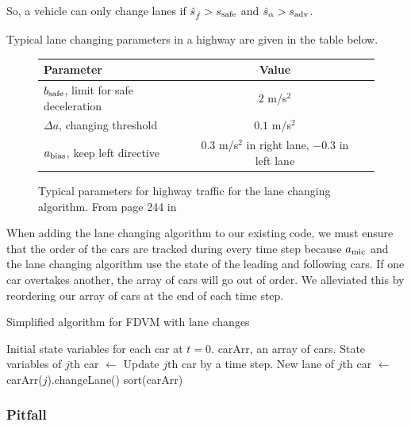 \documentclass[12pt]{article}
\begin{document}
      So, a vehicle can only change lanes if $\hat s_{\hat f} > s_{\rm safe}$ and $\hat s_{\alpha} > s_{\rm adv}$. 

      Typical lane changing parameters in a highway are given in the table below. 
      \begin{figure}[H]
        \begin{center}
          \begin{tabular}{l c c } 
          Parameter & Value \\
          \hline
          $b_{\rm safe}$, limit for safe deceleration & $2$ m/s$^2$ \\
          $\Delta a$, changing threshold & $0.1$ m/s$^2$ \\
          $a_{\rm bias}$, keep left directive & $0.3$ m/s$^2$ in right lane, $-0.3$ in left lane \\

          \end{tabular}
          \end{center}
          \caption{Typical parameters for highway traffic for the lane changing algorithm. From page 244 in \cite{traffic}}
      \end{figure}

      When adding the lane changing algorithm to our existing code, we must ensure that the order of the cars are tracked during every time step because $a_{\rm mic}$ and the lane changing algorithm use the state of the leading and following cars. If one car overtakes another, the array of cars will go out of order. We alleviated this by reordering our array of cars at the end of each time step.  
      \begin{algorithm}
        \caption{Simplified algorithm for FDVM with lane changes}\label{alg:car-following-lane}
        \begin{algorithmic}
        \Require Initial state variables for each car at $t=0$. 
        \Require carArr, an array of cars.
          \State State variables of $j$th car $\gets$ Update $j$th car by a time step.
          \State New lane of $j$th car $\gets$ carArr($j$).changeLane()
          \EndFor
          \State sort(carArr)
        \EndFor
        \end{algorithmic}
        \end{algorithm}
    \subsubsection{Pitfall} \label{lane change pitfalls}
\end{document}
